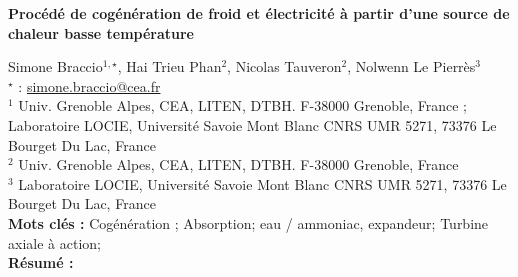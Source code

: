 


    \newpage


%
\begin{flushleft}
\addtocounter{section}{1}
{\Large \textbf{Procédé de cogénération de froid et électricité à partir d'une source de chaleur basse température}}\label{ref:36}
\end{flushleft}
%
Simone Braccio$^{1,\star}$, Hai Trieu Phan$^{2}$, Nicolas Tauveron$^{2}$, Nolwenn Le Pierrès$^{3}$\\[2mm]
$^{\star}$ \Letter : \url{simone.braccio@cea.fr}\\[2mm]
{\footnotesize $^{1}$ Univ. Grenoble Alpes, CEA, LITEN, DTBH. F-38000 Grenoble, France ; Laboratoire LOCIE, Université Savoie Mont Blanc CNRS UMR 5271, 73376 Le Bourget Du Lac, France}\\
{\footnotesize $^{2}$ Univ. Grenoble Alpes, CEA, LITEN, DTBH. F-38000 Grenoble, France}\\
{\footnotesize $^{3}$ Laboratoire LOCIE, Université Savoie Mont Blanc CNRS UMR 5271, 73376 Le Bourget Du Lac, France}\\
[4mm]
%
\noindent \textbf{Mots clés : } Cogénération ; Absorption; eau / ammoniac, expandeur; Turbine axiale à action;\\[4mm]
%
\noindent \textbf{Résumé : } 

